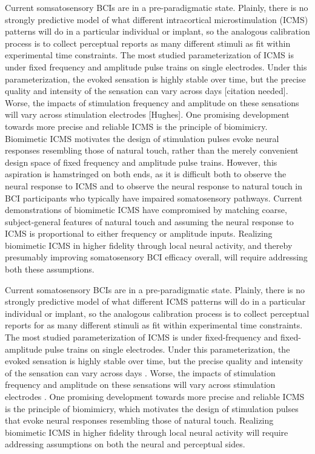 \documentclass[12pt,oneside]{report}
\begin{document}
Current somsatosensory BCIs are in a pre-paradigmatic state. Plainly, there is no strongly predictive model of what different intracortical microstimulation (ICMS) patterns will do in a particular individual or implant, so the analogous calibration process is to collect perceptual reports as many different stimuli as fit within experimental time constraints. The most studied parameterization of ICMS is under fixed frequency and amplitude pulse trains on single electrodes. Under this parameterization, the evoked sensation is highly stable over time, but the precise quality and intensity of the sensation can vary across days [citation needed]. Worse, the impacts of stimulation frequency and amplitude on these sensations will vary across stimulation electrodes [Hughes]. One promising development towards more precise and reliable ICMS is the principle of biomimicry. Biomimetic ICMS motivates the design of stimulation pulses evoke neural responses resembling those of natural touch, rather than the merely convenient design space of fixed frequency and amplitude pulse trains. However, this aspiration is hamstringed on both ends, as it is difficult both to observe the neural response to ICMS and to observe the neural response to natural touch in BCI participants who typically have impaired somatosensory pathways. Current demonstrations of biomimetic ICMS have compromised by matching coarse, subject-general features of natural touch and assuming the neural response to ICMS is proportional to either frequency or amplitude inputs. Realizing biomimetic ICMS in higher fidelity through local neural activity, and thereby presumably improving somatosensory BCI efficacy overall, will require addressing both these assumptions.


Current somatosensory BCIs are in a pre-paradigmatic state. Plainly, there is no strongly predictive model of what different ICMS patterns will do in a particular individual or implant, so the analogous calibration process is to collect perceptual reports for as many different stimuli as fit within experimental time constraints. The most studied parameterization of ICMS is under fixed-frequency and fixed-amplitude pulse trains on single electrodes. Under this parameterization, the evoked sensation is highly stable over time, but the precise quality and intensity of the sensation can vary across days \citep{citationNeeded}. Worse, the impacts of stimulation frequency and amplitude on these sensations will vary across stimulation electrodes \citep{hughesPlaceholder}. One promising development towards more precise and reliable ICMS is the principle of biomimicry, which motivates the design of stimulation pulses that evoke neural responses resembling those of natural touch. Realizing biomimetic ICMS in higher fidelity through local neural activity will require addressing assumptions on both the neural and perceptual sides.
\end{document}
